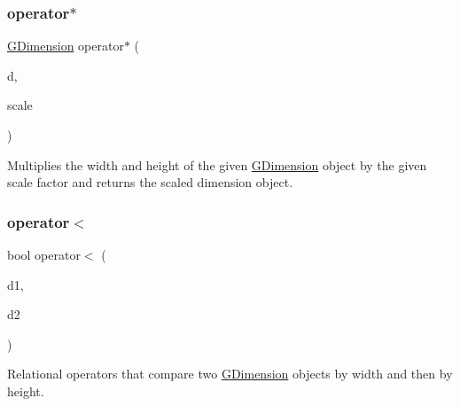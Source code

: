 \mbox{\label{structGDimension_a84a7c3c5763523efef91d5b6398c730c}} 
\subsubsection{\texorpdfstring{operator$\ast$}{operator*}}
{\footnotesize\ttfamily \mbox{\hyperlink{structGDimension}{G\+Dimension}} operator$\ast$ (\begin{DoxyParamCaption}\item[{const \mbox{\hyperlink{structGDimension}{G\+Dimension}} \&}]{d,  }\item[{double}]{scale }\end{DoxyParamCaption})\hspace{0.3cm}{\ttfamily [friend]}}



Multiplies the width and height of the given \mbox{\hyperlink{structGDimension}{G\+Dimension}} object by the given scale factor and returns the scaled dimension object. 

\mbox{\label{structGDimension_abcbb6e3b6e238b5155c96d6340bf5f43}} 
\subsubsection{\texorpdfstring{operator$<$}{operator<}}
{\footnotesize\ttfamily bool operator$<$ (\begin{DoxyParamCaption}\item[{const \mbox{\hyperlink{structGDimension}{G\+Dimension}} \&}]{d1,  }\item[{const \mbox{\hyperlink{structGDimension}{G\+Dimension}} \&}]{d2 }\end{DoxyParamCaption})\hspace{0.3cm}{\ttfamily [friend]}}



Relational operators that compare two \mbox{\hyperlink{structGDimension}{G\+Dimension}} objects by width and then by height. 

\mbox{\label{structGDimension_a528e8a99e8c635db2eab715975ad0e8d}} 
